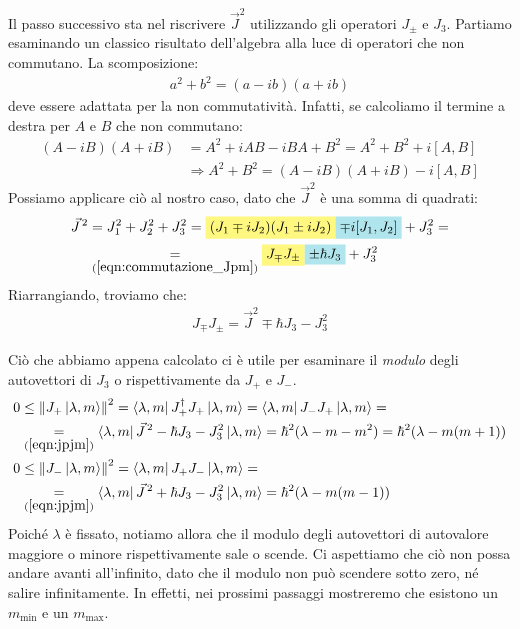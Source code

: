 \documentclass[../../FisicaTeorica.tex]{subfiles}
\begin{document}
Il passo successivo sta nel riscrivere $\vec{J}^2$ utilizzando gli operatori $J_\pm$ e $J_3$. Partiamo esaminando un classico risultato dell'algebra alla luce di operatori che non commutano. La scomposizione:
\begin{align*}
a^2 + b^2 = (a-ib)(a+ib)
\end{align*}
deve essere adattata per la non commutatività. Infatti, se calcoliamo il termine a destra per $A$ e $B$ che non commutano:
\begin{align*}
(A-iB)(A+iB)&=A^2 +iAB - iBA +B^2=A^2 +B^2 +i[A,B]\\
&\Rightarrow A^2+B^2 = (A-iB)(A+iB)-i[A,B]
\end{align*}
Possiamo applicare ciò al nostro caso, dato che $\vec{J}^2$ è una somma di quadrati:
\begin{align}\nonumber
\vec{J}^{\,2}&= J_1^2 + J_2^2 + J_3^2 = \hlc{Yellow}{(J_1 \mp i J_2)(J_1 \pm i J_2)} \hlc{SkyBlue}{\mp i [J_1,J_2]}+J_3^2 =\\
&\underset{(\ref{eqn:commutazione_Jpm})}{=} \hlc{Yellow}{J_\mp J_\pm} \hlc{SkyBlue}{\pm \hbar J_3} + J_3^2 \label{eqn:Jquadro}
\end{align}
Riarrangiando, troviamo che:
\begin{align}
J_\mp J_\pm = \vec{J}^2 \mp \hbar J_3 - J_3^2
\label{eqn:jpjm}
\end{align}

Ciò che abbiamo appena calcolato ci è utile per esaminare il \textit{modulo} degli autovettori di $J_3$  o  rispettivamente da $J_+$ e $J_-$.
\begin{align}\nonumber
0 &\leq \left\lVert J_+ \Ket{\lambda,m}\right\rVert^2 = \Bra{\lambda, m} J_+^\dag J_+ \Ket{\lambda, m} = \Bra{\lambda, m}J_- J_+ \Ket{\lambda, m} =\\
&\underset{(\ref{eqn:jpjm})}{=} \Bra{\lambda, m} \vec{J}^{\,2} - \hbar J_3 - J_3^2 \Ket{\lambda, m}= \hbar^2 (\lambda - m - m^2) = \hbar^2(\lambda-m(m+1))
\label{eqn:piu1}\\
0 &\leq \left\lVert J_- \Ket{\lambda,m}\right\rVert^2 = \Bra{\lambda,m}J_+ J_- \Ket{\lambda,m} = \nonumber \\
&\underset{(\ref{eqn:jpjm})}{=} \Bra{\lambda,m}\vec{J}^{\,2} + \hbar J_3 - J_3^2 \Ket{\lambda,m} = \hbar^2 (\lambda-m(m-1)) \label{eqn:meno1}
\end{align}
Poiché $\lambda$ è fissato, notiamo allora che il modulo degli autovettori di autovalore maggiore o minore rispettivamente sale o scende. Ci aspettiamo che ciò non possa andare avanti all'infinito, dato che il modulo non può scendere sotto zero, né salire infinitamente. In effetti, nei prossimi passaggi mostreremo che esistono un $m_{\min}$ e un $m_{\max}$.\\
\end{document}
